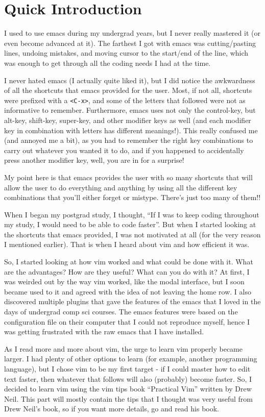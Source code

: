 \chapter{Quick Introduction}

I used to use emacs during my undergrad years, but I never really mastered  it (or even become advanced at it).
The farthest I got with emacs was cutting/pasting lines, undoing mistakes, and moving cursor to the start/end of the line, which was enough to get through all the coding needs I had at the time.

I never hated emacs (I actually quite liked it), but I did notice the awkwardness of all the shortcuts that emacs provided for the user.
Most, if not all, shortcuts were prefixed with a \verb|<C-x>|, and some of the letters that followed were not as informative to remember.
Furthermore, emacs uses not only the control-key, but alt-key, shift-key, super-key, and other modifier keys as well (and each modifier key in combination with letters has different meanings!).
This really confused me (and annoyed me a bit), as you had to remember the right key combinations to carry out whatever you wanted it to do, and if you happened to accidentally press another modifier key, well, you are in for a surprise!

My point here is that emacs provides the user with so many shortcuts that will allow the user to do everything and anything by using all the different key combinations that you'll either forget or mistype.
There's just too many of them!!

When I began my postgrad study, I thought, ``If I was to keep coding throughout my study, I would need to be able to code faster''.
But when I started looking at the shortcuts that emacs provided, I was not motivated at all (for the very reason I mentioned earlier).
That is when I heard about vim and how efficient it was.

So, I started looking at how vim worked and what could be done with it.
What are the advantages?
How are they useful?
What can you do with it?
At first, I was weirded out by the way vim worked, like the modal interface, but I soon became used to it and agreed with the idea of not leaving the home row.
I also discovered multiple plugins that gave the features of the emacs that I loved in the days of undergrad comp sci courses.
The emacs features were based on the configuration file on their computer that I could not reproduce myself, hence I was getting frustrated with the raw emacs that I have installed.

As I read more and more about vim, the urge to learn vim properly became larger.
I had plenty of other options to learn (for example, another programming language), but I chose vim to be my first target - if I could master how to edit text faster, then whatever that follows will also (probably) become faster.
So, I decided to learn vim using the vim tips book ``Practical Vim'' written by Drew Neil.
This part will mostly contain the tips that I thought was very useful from Drew Neil's book, so if you want more details, go and read his book.

